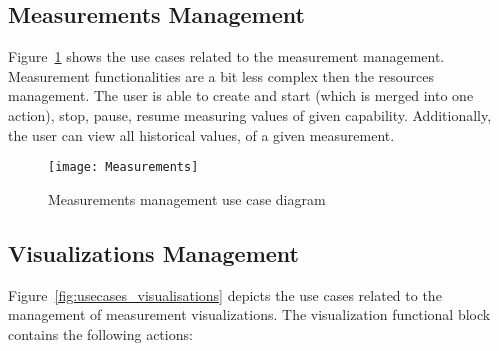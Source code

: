 \subsection{Measurements Management}
\label{subsec:measurement_mgmnt}



Figure~\ref{fig:usecases_measurements} shows the use cases related to the measurement management. Measurement functionalities are a bit less complex then the resources management. The user is able to create and start (which is merged into one action), stop, pause, resume measuring values of given capability. Additionally, the user can view all historical values, of a given measurement.

\begin{figure}[ht]
\centering
\texttt{[image: Measurements]}
\caption{Measurements management use case diagram}
\label{fig:usecases_measurements}
\end{figure}

\subsection{Visualizations Management}
\label{subsec:visualizations_mgmnt}

Figure~\ref{fig:usecases_visualisations} depicts the use cases related to the management of  measurement visualizations. The visualization functional block contains the following actions:

